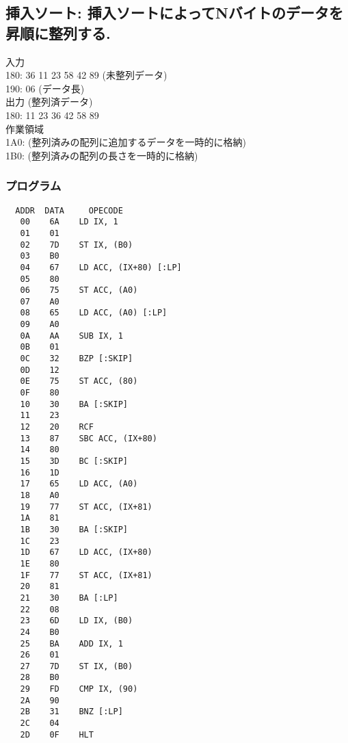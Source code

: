 \documentclass[titlepage]{jsarticle}
\theoremstyle{definition}
\begin{document}
\subsection{挿入ソート: 挿入ソートによってNバイトのデータを昇順に整列する.}
入力 \\
180: 36 11 23 58 42 89 (未整列データ) \\
190: 06 (データ長) \\

出力 (整列済データ) \\
180: 11 23 36 42 58 89 \\

作業領域 \\
1A0: (整列済みの配列に追加するデータを一時的に格納) \\
1B0: (整列済みの配列の長さを一時的に格納) \\


\subsubsection{プログラム}

\begin{lstlisting}
  ADDR  DATA     OPECODE
   00    6A    LD IX, 1
   01    01
   02    7D    ST IX, (B0)
   03    B0
   04    67    LD ACC, (IX+80) [:LP]
   05    80
   06    75    ST ACC, (A0)
   07    A0
   08    65    LD ACC, (A0) [:LP]
   09    A0
   0A    AA    SUB IX, 1
   0B    01
   0C    32    BZP [:SKIP]
   0D    12
   0E    75    ST ACC, (80)
   0F    80
   10    30    BA [:SKIP]
   11    23
   12    20    RCF
   13    87    SBC ACC, (IX+80)
   14    80
   15    3D    BC [:SKIP]
   16    1D
   17    65    LD ACC, (A0)
   18    A0
   19    77    ST ACC, (IX+81)
   1A    81
   1B    30    BA [:SKIP]
   1C    23
   1D    67    LD ACC, (IX+80)
   1E    80
   1F    77    ST ACC, (IX+81)
   20    81
   21    30    BA [:LP]
   22    08
   23    6D    LD IX, (B0)
   24    B0
   25    BA    ADD IX, 1
   26    01
   27    7D    ST IX, (B0)
   28    B0
   29    FD    CMP IX, (90)
   2A    90
   2B    31    BNZ [:LP]
   2C    04
   2D    0F    HLT


\end{lstlisting}
\end{document}

